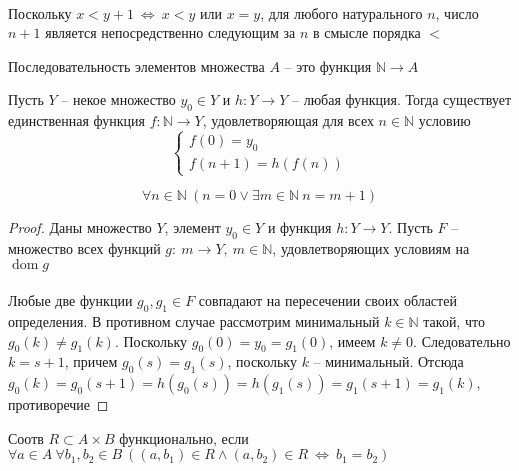 \\
Поскольку $x < y +1\ \Leftrightarrow\ x < y \text{ или } x = y$, для любого натурального $n$, число $n+1$ является непосредственно следующим за $n$ в смысле порядка $<$

\begin{defn}
Последовательность элементов множества $A$ -- это функция $\mathbb{N} \to A$
\end{defn}

\begin{theo}[О рекурсии]
Пусть $Y$ -- некое множество $y_0 \in Y$ и $h: Y \to Y$ -- любая функция. Тогда существует единственная функция $f: \mathbb{N} \to Y$, удовлетворяющая для всех $n \in \mathbb{N}$ условию
$$
\begin{cases}
	f(0) = y_0\\
	f(n+1) = h(f(n))
\end{cases}
$$
\end{theo}

\begin{lem}
$$
\forall n \in \mathbb{N}\ (n = 0 \vee \exists m \in \mathbb{N}\ n = m+1)
$$
\end{lem}

\begin{proof}
Даны множество $Y$, элемент $y_0 \in Y$ и функция $h: Y \to Y$. Пусть $F$ -- множество всех функций $g:\ m \to Y,\ m \in \mathbb{N}$, удовлетворяющих условиям на $\operatorname{dom} g$\\
\\
Любые две функции $g_0, g_1 \in F$ совпадают на пересечении своих областей определения. В противном случае рассмотрим минимальный $k \in \mathbb{N}$ такой, что $g_0(k) \ne g_1(k)$. Поскольку $g_0(0) = y_0 = g_1(0)$, имеем $k \ne 0$. Следовательно $k = s+1$, причем $g_0(s) = g_1(s)$, поскольку $k$ -- минимальный. Отсюда $g_0(k) = g_0(s+1) = h(g_0(s)) = h(g_1(s)) = g_1(s+1) = g_1(k)$, противоречие
\end{proof}

\begin{defn}
Соотв $R \subset A \times B$ функционально, если $\forall a \in A\ \forall b_1, b_2 \in B\ ((a, b_1) \in R \wedge (a, b_2) \in R\ \Leftrightarrow\ b_1 = b_2)$\\
\end{defn}

